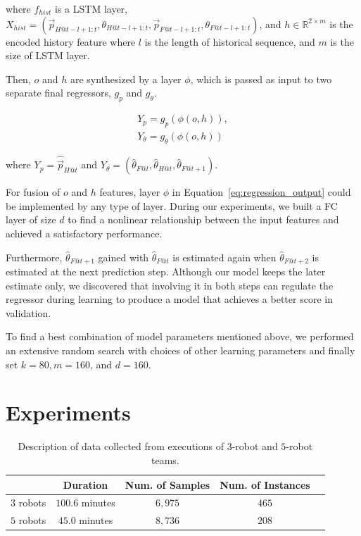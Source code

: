 \documentclass[letterpaper, 10 pt, conference]{ieeeconf}  %
\begin{document}
     where $f_{hist}$ is a LSTM layer,
		$X_{hist} = (\vec{p}_{H@t-l+1:t}, \theta_{H@t-l+1:t},
		             \vec{p}_{F@t-l+1:t}, \theta_{F@t-l+1:t})$,
		and $h \in \mathbb{R}^{2 \times m}$ is the encoded history feature
	where $l$ is the length of historical sequence,
	and $m$ is the size of LSTM layer.

	Then, $o$ and $h$ are synthesized by a layer $\phi$, which is
	passed as input to two separate final regressors, $g_{p}$ and $g_\theta$.

	\begin{equation}
	\begin{split}
	Y_{p} = g_{p}(\phi(o, h)),\\
	Y_{\theta}= g_{\theta}(\phi(o, h))
	\end{split}
	\label{eq:regression_output}
	\end{equation}

	where
	$Y_{p} = \hat{\vec{p}}_{H@t}$ and
	$Y_{\theta} = (\hat{\theta}_{F@t}, \hat{\theta}_{H@t}, \hat{\theta}_{F@t+1})$.

	For fusion of $o$ and $h$ features, layer $\phi$ in Equation~\ref{eq:regression_output}
	could be implemented by any type of layer. During our experiments, we
	built a FC layer of size $d$ to find a nonlinear relationship between the input
	features and achieved a satisfactory performance.

	Furthermore, $\hat{\theta}_{F@t+1}$ gained with $\hat{\theta}_{F@t}$ is
	estimated again when $\hat{\theta}_{F@t+2}$ is estimated at the next
	prediction step. Although our model keeps the later estimate only,
	we discovered that involving it in both steps can regulate the regressor
	during learning to produce a model that achieves a better score in validation.

	To find a best combination of model parameters mentioned above, we performed
	an extensive random search with choices of other learning parameters and
	finally set $k=80, m=160$, and $d=160$.


	\section{Experiments}
	\label{sec:experiments}

	\setlength{\tabcolsep}{0.5em} %
	{\renewcommand{\arraystretch}{1.2}%
		\begin{table}[t]
			\label{table:data_description}
			\centering
			\begin{tabular}{|c|c|c|c|c|}
				\hline
							&  Duration & Num. of Samples & Num. of Instances  \\ \hline
				$3$ robots & $100.6$ minutes & $6,975$ & $465$  \\ \hline
				$5$ robots & $45.0$ minutes  & $8,736$ & $208$  \\ \hline
			\end{tabular}
			\caption{Description of data collected from executions of $3$-robot and $5$-robot teams.}
		\end{table}
	}
\end{document}
